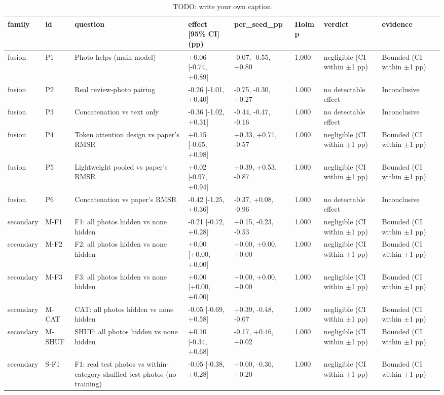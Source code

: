\begin{table}
\caption{TODO: write your own caption}\label{tab:T15-amazon-photo-tests}
\scriptsize
\begin{tabularx}{\textheight}{ll>{\raggedright\arraybackslash}Xlll>{\raggedright\arraybackslash}X>{\raggedright\arraybackslash}X}
\toprule
family & id & question & effect [95\% CI] (pp) & per\_\allowbreak{}seed\_\allowbreak{}pp & Holm p & verdict & evidence \\
\midrule
fusion & P1 & Photo helps (main model) & +0.06 [-0.74, +0.89] & -0.07, -0.55, +0.80 & 1.000 & negligible (CI within $\pm$1 pp) & Bounded (CI within $\pm$1 pp) \\
fusion & P2 & Real review-photo pairing & -0.26 [-1.01, +0.40] & -0.75, -0.30, +0.27 & 1.000 & no detectable effect & Inconclusive \\
fusion & P3 & Concatenation vs text only & -0.36 [-1.02, +0.31] & -0.44, -0.47, -0.16 & 1.000 & no detectable effect & Inconclusive \\
fusion & P4 & Token attention design vs paper's RMSR & +0.15 [-0.65, +0.98] & +0.33, +0.71, -0.57 & 1.000 & negligible (CI within $\pm$1 pp) & Bounded (CI within $\pm$1 pp) \\
fusion & P5 & Lightweight pooled vs paper's RMSR & +0.02 [-0.97, +0.94] & +0.39, +0.53, -0.87 & 1.000 & negligible (CI within $\pm$1 pp) & Bounded (CI within $\pm$1 pp) \\
fusion & P6 & Concatenation vs paper's RMSR & -0.42 [-1.25, +0.36] & -0.37, +0.08, -0.96 & 1.000 & no detectable effect & Inconclusive \\
secondary & M-F1 & F1: all photos hidden vs none hidden & -0.21 [-0.72, +0.28] & +0.15, -0.23, -0.53 & 1.000 & negligible (CI within $\pm$1 pp) & Bounded (CI within $\pm$1 pp) \\
secondary & M-F2 & F2: all photos hidden vs none hidden & +0.00 [+0.00, +0.00] & +0.00, +0.00, +0.00 & 1.000 & negligible (CI within $\pm$1 pp) & Bounded (CI within $\pm$1 pp) \\
secondary & M-F3 & F3: all photos hidden vs none hidden & +0.00 [+0.00, +0.00] & +0.00, +0.00, +0.00 & 1.000 & negligible (CI within $\pm$1 pp) & Bounded (CI within $\pm$1 pp) \\
secondary & M-CAT & CAT: all photos hidden vs none hidden & -0.05 [-0.69, +0.58] & +0.39, -0.48, -0.07 & 1.000 & negligible (CI within $\pm$1 pp) & Bounded (CI within $\pm$1 pp) \\
secondary & M-SHUF & SHUF: all photos hidden vs none hidden & +0.10 [-0.34, +0.68] & -0.17, +0.46, +0.02 & 1.000 & negligible (CI within $\pm$1 pp) & Bounded (CI within $\pm$1 pp) \\
secondary & S-F1 & F1: real test photos vs within-category shuffled test photos (no training) & -0.05 [-0.38, +0.28] & +0.00, -0.36, +0.20 & 1.000 & negligible (CI within $\pm$1 pp) & Bounded (CI within $\pm$1 pp) \\
\bottomrule
\end{tabularx}
\par{}
\end{table}
